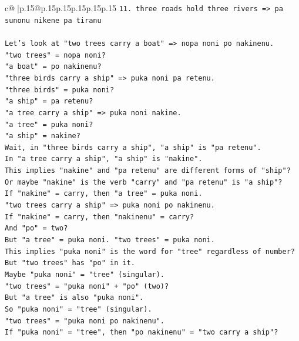 \documentclass{article}
\begin{document}
{\begin{supertabular}{c@{$\;$}|p{.15\linewidth}@{}p{.15\linewidth}p{.15\linewidth}p{.15\linewidth}p{.15\linewidth}p{.15\linewidth}}
{{{\texttt{11. three roads hold three rivers => pa sunonu nikene pa tiranu} \\
\\ 
\texttt{Let's look at "two trees carry a boat" => nopa noni po nakinenu.} \\
\texttt{"two trees" = nopa noni?} \\
\texttt{"a boat" = po nakinenu?} \\
\texttt{"three birds carry a ship" => puka noni pa retenu.} \\
\texttt{"three birds" = puka noni?} \\
\texttt{"a ship" = pa retenu?} \\
\texttt{"a tree carry a ship" => puka noni nakine.} \\
\texttt{"a tree" = puka noni?} \\
\texttt{"a ship" = nakine?} \\
\texttt{Wait, in "three birds carry a ship", "a ship" is "pa retenu".} \\
\texttt{In "a tree carry a ship", "a ship" is "nakine".} \\
\texttt{This implies "nakine" and "pa retenu" are different forms of "ship"?} \\
\texttt{Or maybe "nakine" is the verb "carry" and "pa retenu" is "a ship"?} \\
\texttt{If "nakine" = carry, then "a tree" = puka noni.} \\
\texttt{"two trees carry a ship" => puka noni po nakinenu.} \\
\texttt{If "nakine" = carry, then "nakinenu" = carry?} \\
\texttt{And "po" = two?} \\
\texttt{But "a tree" = puka noni. "two trees" = puka noni.} \\
\texttt{This implies "puka noni" is the word for "tree" regardless of number?} \\
\texttt{But "two trees" has "po" in it.} \\
\texttt{Maybe "puka noni" = "tree" (singular).} \\
\texttt{"two trees" = "puka noni" + "po" (two)?} \\
\texttt{But "a tree" is also "puka noni".} \\
\texttt{So "puka noni" = "tree" (singular).} \\
\texttt{"two trees" = "puka noni po nakinenu".} \\
\texttt{If "puka noni" = "tree", then "po nakinenu" = "two carry a ship"?} \\
}}}
\end{supertabular}}
\end{document}
